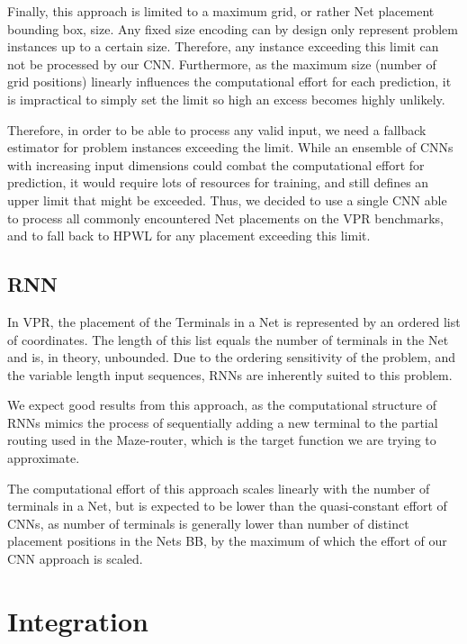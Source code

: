 Finally, this approach is limited to a maximum grid, or rather Net placement bounding box, size. Any fixed size encoding can by design only represent problem instances up to a certain size. Therefore, any instance exceeding this limit can not be processed by our \gls{CNN}. Furthermore, as the maximum size (number of grid positions) linearly influences the computational effort for each prediction, it is impractical to simply set the limit so high an excess becomes highly unlikely.

Therefore, in order to be able to process any valid input, we need a fallback estimator for problem instances exceeding the limit. While an ensemble of \glspl{CNN} with increasing input dimensions could combat the computational effort for prediction, it would require lots of resources for training, and still defines an upper limit that might be exceeded. Thus, we decided to use a single \gls{CNN} able to process all commonly encountered Net placements on the \gls{VPR} benchmarks, and to fall back to \gls{HPWL} for any placement exceeding this limit.

\subsection{\gls{RNN}}

In \gls{VPR}, the placement of the Terminals in a Net is represented by an ordered list of coordinates. The length of this list equals the number of terminals in the Net and is, in theory, unbounded. Due to the ordering sensitivity of the problem, and the variable length input sequences, \glspl{RNN} are inherently suited to this problem.

We expect good results from this approach, as the computational structure of \glspl{RNN} mimics the process of sequentially adding a new terminal to the partial routing used in the Maze-router, which is the target function we are trying to approximate.

The computational effort of this approach scales linearly with the number of terminals in a Net, but is expected to be lower than the quasi-constant effort of \glspl{CNN}, as number of terminals is generally lower than number of distinct placement positions in the Nets \gls{BB}, by the maximum of which the effort of our CNN approach is scaled.

\section{Integration}

